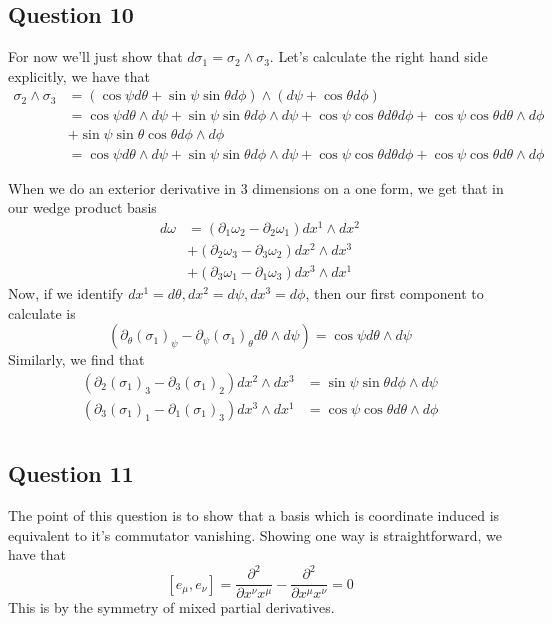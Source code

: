 \documentclass[11pt, a4paper]{article}   	%
\theoremstyle{slplain}
\begin{document}
\subsection{Question 10} 
For now we'll just show that $ d\sigma _ 1  = \sigma_2 \wedge  \sigma_3$. 
Let's calculate the right hand side explicitly, we have that
\begin{align*}
	\sigma_2 \wedge  \sigma_3 & = ( \cos \psi d \theta + \sin \psi \sin \theta d \phi ) \wedge ( d \psi + \cos \theta d \phi )  \\
	&=  \cos \psi d \theta \wedge  d \psi + \sin \psi \sin \theta d \phi \wedge  d \psi + \cos \psi \cos \theta d \theta d \phi + \cos \psi \cos \theta d \theta \wedge  d \phi \\ 
	& + \sin \psi \sin \theta \cos \theta d \phi \wedge  d \phi \\
	&=  \cos \psi d \theta \wedge  d \psi + \sin \psi \sin \theta d \phi \wedge  d \psi + \cos \psi \cos \theta d \theta d \phi + \cos \psi \cos \theta d \theta \wedge  d \phi 
\end{align*}

When we do an exterior derivative in 3 dimensions on a one form, 
we get that in our wedge product basis
\begin{align*}
	d \omega & = ( \partial_ 1 \omega _ 2 - \partial  _ 2 \omega_1 ) d x^ 1 \wedge  dx^ 2 \\
		 & + ( \partial _ 2 \omega_3 - \partial  _ 3 \omega _ 2 ) dx^ 2 \wedge  dx^ 3  \\
		 & + ( \partial  _ 3 \omega_1 - \partial  _ 1 \omega_3 ) dx ^ 3 \wedge  dx ^ 1
\end{align*}
Now, if we identify $d x^ 1 = d \theta, dx^ 2 = d \psi , dx^ 3 = d \phi $, 
then our first component to calculate is 
 \[
	 (  \partial  _{ \theta }  ( \sigma_1)   _{ \psi } - \partial  _{ \psi } ( \sigma_1 )_{ \theta } d \theta \wedge  d \psi )  = \cos \psi d \theta \wedge  d \psi 
\] Similarly, we find that 
\begin{align*}
	( \partial_2 ( \sigma_{1} ) _ 3 - \partial _ 3 ( \sigma_{ 1 }) _ 2 ) dx^ 2 \wedge  dx^ 3 & = \sin \psi \sin \theta d \phi \wedge  d\psi  \\
	( \partial _ 3 ( \sigma_1 ) _{ 1 } - \partial  _ 1 ( \sigma_ 1 ) _ 3 ) dx^ 3 \wedge  dx ^ 1 &=  \cos \psi \cos \theta d \theta \wedge  d \phi \\
\end{align*}

\subsection{Question 11} 
The point of this question is to show that a basis which 
is coordinate induced is equivalent to it's commutator vanishing. 
Showing one way is straightforward, we have that 
\[
	[ e_\mu, e_\nu ] = \frac{\partial ^ 2 }{\partial x^\nu x^\mu  } - \frac{\partial ^ 2 }{\partial  x^\mu x^\nu} = 0   
\] This is by the symmetry of mixed partial derivatives. 
\end{document}

